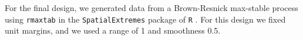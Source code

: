 \documentclass[useAMS,usenatbib,referee]{biom}
\begin{document}
For the final design, we generated data from a Brown-Resnick max-stable process  using \texttt{rmaxtab} in the \texttt{SpatialExtremes} package of \texttt{R} \citep{Ribatet2015}.
For this design we fixed unit \Frechet margins, and we used a range of 1 and smoothness 0.5.
\end{document}
